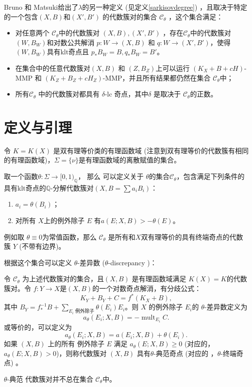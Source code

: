Bruno 和 Matsuki给出了$\lambda$的另一种定义 (见定义\ref{sarkisovdegree}) ，且取决于特定的一个包含$(X,B)$和$(X',B')$ 的代数簇对的集合 $\mathcal{C}_{\theta}$ ，这个集合满足：
\begin{itemize}
  \item
   对任意两个  $\mathcal{C}_{\theta}$中的代数簇对 $(X,B),(X',B')$ ，存在$\mathcal{C}_{\theta}$中的代数簇对 $(W,B_W)$和对数公共解消 $p:W\to (X,B)$ 和 $q:W\to (X',B')$，使得 $(W,B_W)$具有klt奇点且 $p_*B_W=B,q_*B_W=B'$。
  \item  在集合中的任意代数簇对$(X,B)$ 和 $(Z,B_Z)$上可以运行  $(K_X+B+cH)$-MMP 和 $(K_Z+B_Z+cH_Z)$-MMP，并且所有结果都仍然在集合 $\mathcal{C}_{\theta}$中；
  \item 所有$\mathcal{C}_{\theta}$ 中的代数簇对都具有 $\delta$-lc 奇点，其中$\delta$ 是取决于 $\mathcal{C}_{\theta}$的正数。 
\end{itemize}

\section{定义与引理}
令 $ K=K(X) $ 是双有理等价类的有理函数域 (注意到双有理等价的代数簇有相同的有理函数域)，$ \Sigma=\{\nu\} $是有理函数域的离散赋值的集合。
\begin{definition}\label{thetacategory}
  \cite[Definition 3.5]{brunoLogSarkisovProgram1995}
  取一个函数$\theta:\Sigma\to [0,1)_{\mathbb{Q}}$， 那么 可以定义关于  $\theta$的集合$ \mathcal{C}_{\theta} $，包含满足下列条件的具有klt奇点的$\mathbb{Q}$-分解代数簇对$ (X,B=\sum a_{i}B_{i}) $：
  \begin{enumerate}
    \item $ a_i=\theta(B_i) $；
    \item 对所有 $ X $上的例外除子 $E $ 有$ a(E;X,B)>-\theta(E) $。
  \end{enumerate}
\end{definition}
\begin{remark}
例如取 $\theta \equiv 0$为常值函数，那么 $\mathcal{C}_{\theta}$ 是所有和$X$双有理等价的具有终端奇点的代数簇 $Y$ (不带有边界)。
\end{remark}
  根据这个集合可以定义 $\theta$-差异数 ($\theta$-discrepancy )：
\begin{definition}
  令 $\mathcal{C}_{\theta}$ 为上述代数簇对的集合，且$(X, B)$ 是有理函数域满足 $K(X)=K$的代数簇对。令  $f: Y\to X$是$(X, B)$的一个对数奇点解消，有分歧公式：
  \[ K_{Y}+B_{Y}+C=f^*(K_{X}+B) ,\]
  其中 $B_{Y}=f^{-1}_*B+ \sum_{E_{i}\text{ 例外除子}} \theta(E_{i})E_{i}$。则 $X$ 的例外除子 $E_{i}$的 $\theta$-差异数定义为
  \[ a_{\theta}(E_{i};X,B)=-\operatorname{mult}_{E_{i}}C. \]
  或等价的，可以定义为
  \[ a_{\theta}(E_{i};X,B)=a(E_{i};X,B)+\theta(E_{i}). \]
  如果 $(X,B)$ 上的所有 例外除子 $E$ 满足   $a_{\theta}(E;X,B)\geqslant 0$ (对应的， $a_{\theta}(E;X,B)> 0$)，则称代数簇对 $(X,B)$ 具有$\theta$-典范奇点 (对应的 ，$\theta$-终端奇点)  。
\end{definition}
\begin{remark}
 $\theta$-典范 代数簇对并不总在集合 $\mathcal{C}_{\theta}$中。
\end{remark}


